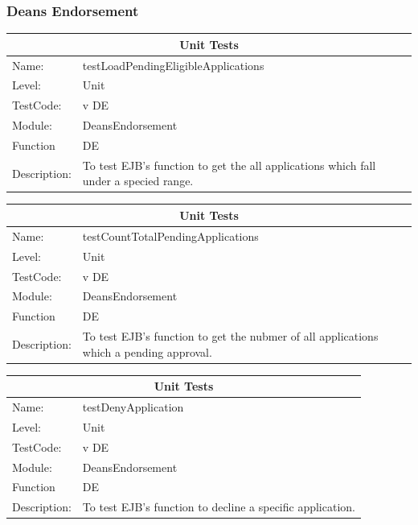 \documentclass[12pt]{article}
\begin{document}
\subsubsection{Deans Endorsement}

\begin{center}
\begin{tabular}{|l|p{12cm}|}
\hline
\multicolumn{2}{|c|}{\bf Unit Tests} \\
\hline
 Name: & testLoadPendingEligibleApplications  \\
\hline
Level: & Unit \\
\hline
TestCode: & v DE \\
\hline
Module:& DeansEndorsement \\
\hline
Function & DE \\
\hline
Description: & To test EJB's function to get the all applications which fall under a specied range. \\
\hline
\end{tabular}
\end{center}

\begin{center}
\begin{tabular}{|l|p{12cm}|}
\hline
\multicolumn{2}{|c|}{\bf Unit Tests} \\
\hline
 Name: & testCountTotalPendingApplications  \\
\hline
Level: & Unit \\
\hline
TestCode: & v DE \\
\hline
Module:& DeansEndorsement \\
\hline
Function & DE \\
\hline
Description: & To test EJB's function to get the nubmer of all applications which a pending approval. \\
\hline
\end{tabular}
\end{center}

\begin{center}
\begin{tabular}{|l|p{12cm}|}
\hline
\multicolumn{2}{|c|}{\bf Unit Tests} \\
\hline
 Name: & testDenyApplication  \\
\hline
Level: & Unit \\
\hline
TestCode: & v DE \\
\hline
Module:& DeansEndorsement \\
\hline
Function & DE \\
\hline
Description: & To test EJB's function to decline a specific application. \\
\hline
\end{tabular}
\end{center}
\end{document}
